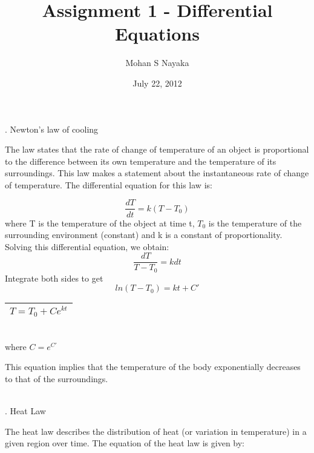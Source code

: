 \documentclass{article}
\begin{document}
\title{Assignment 1 - Differential Equations }

\date{July 22, 2012}
\author{Mohan S Nayaka}
\renewcommand{\arraystretch}{1.5}
. Newton's law of cooling

The law states that the rate of change of temperature of an object
is proportional to the difference between its own temperature and
the temperature of its surroundings. This law makes a statement about
the instantaneous rate of change of temperature.
The differential equation for this law is:

\[ \frac{dT}{dt} = k(T-T_0) \]
where T is the temperature of the object at time t, $T_0$ is the temperature of the surrounding environment (constant) and k is a constant of proportionality.
Solving this differential equation, we obtain:
\[ \frac{dT}{T-T_0} = kdt \]
Integrate both sides to get
\[ ln(T - T_0) = kt + C' \]
\begin{center}
\begin{tabular}{|c|}
\hline
$T = T_0 + C e^{kt}$
\\
\hline
\end{tabular}
\\
where $C=e^{C'}$
\end{center}

This equation implies that the temperature of the body exponentially decreases to that of the surroundings.
\\
\\
. Heat Law

The heat law describes the distribution of heat (or variation in temperature) in a given region over time.
The equation of the heat law is given by:
\end{document}
